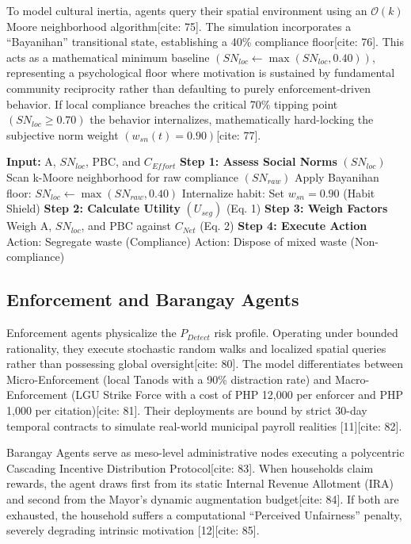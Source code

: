\documentclass[conference]{IEEEtran}
\begin{document}
To model cultural inertia, agents query their spatial environment using an $\mathcal{O}(k)$ Moore neighborhood algorithm[cite: 75]. The simulation incorporates a ``Bayanihan'' transitional state, establishing a 40\% compliance floor[cite: 76]. This acts as a mathematical minimum baseline $(SN_{loc}\leftarrow \max(SN_{loc},0.40))$, representing a psychological floor where motivation is sustained by fundamental community reciprocity rather than defaulting to purely enforcement-driven behavior. If local compliance breaches the critical 70\% tipping point $(SN_{loc}\ge0.70)$ the behavior internalizes, mathematically hard-locking the subjective norm weight $(w_{sn}(t)=0.90)$[cite: 77]. 

\begin{algorithm}
\caption{The Household's Daily Decision Process [cite: 78]}
\begin{algorithmic}[1]
\STATE \textbf{Input:} A, $SN_{loc}$, PBC, and $C_{Effort}$
\STATE \textbf{Step 1: Assess Social Norms} $(SN_{loc})$
\STATE Scan k-Moore neighborhood for raw compliance $(SN_{raw})$
\STATE Apply Bayanihan floor: $SN_{loc}\leftarrow \max(SN_{raw},0.40)$
\STATE Internalize habit: Set $w_{sn}=0.90$ (Habit Shield)
\ENDIF
\STATE \textbf{Step 2: Calculate Utility} $(U_{seg})$ (Eq. 1)
\STATE \textbf{Step 3: Weigh Factors}
\STATE Weigh A, $SN_{loc}$, and PBC against $C_{Net}$ (Eq. 2)
\STATE \textbf{Step 4: Execute Action}
\STATE Action: Segregate waste (Compliance)
\ELSE
\STATE Action: Dispose of mixed waste (Non-compliance)
\ENDIF
\end{algorithmic}
\end{algorithm}

\subsection{Enforcement and Barangay Agents}
Enforcement agents physicalize the $P_{Detect}$ risk profile. Operating under bounded rationality, they execute stochastic random walks and localized spatial queries rather than possessing global oversight[cite: 80]. The model differentiates between Micro-Enforcement (local Tanods with a 90\% distraction rate) and Macro-Enforcement (LGU Strike Force with a cost of PHP 12,000 per enforcer and PHP 1,000 per citation)[cite: 81]. Their deployments are bound by strict 30-day temporal contracts to simulate real-world municipal payroll realities [11][cite: 82]. 

Barangay Agents serve as meso-level administrative nodes executing a polycentric Cascading Incentive Distribution Protocol[cite: 83]. When households claim rewards, the agent draws first from its static Internal Revenue Allotment (IRA) and second from the Mayor's dynamic augmentation budget[cite: 84]. If both are exhausted, the household suffers a computational ``Perceived Unfairness'' penalty, severely degrading intrinsic motivation [12][cite: 85].
\end{document}

